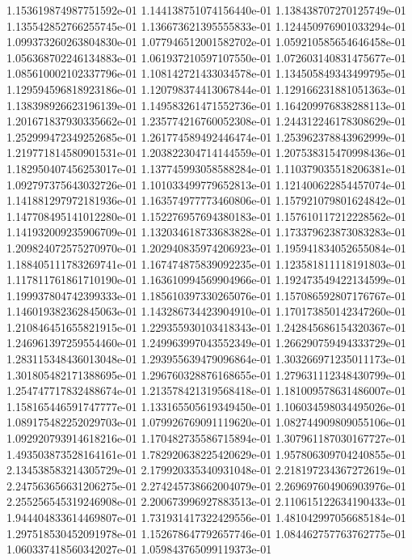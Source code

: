 1.153619874987751592e-01
1.144138751074156440e-01
1.138438707270125749e-01
1.135542852766255745e-01
1.136673621395555833e-01
1.124450976901033294e-01
1.099373260263804830e-01
1.077946512001582702e-01
1.059210585654646458e-01
1.056368702246134883e-01
1.061937210597107550e-01
1.072603140831475677e-01
1.085610002102337796e-01
1.108142721433034578e-01
1.134505849343499795e-01
1.129594596818923186e-01
1.120798374413067844e-01
1.129166231881051363e-01
1.138398926623196139e-01
1.149583261471552736e-01
1.164209976838288113e-01
1.201671837930335662e-01
1.235774216760052308e-01
1.244312246178308629e-01
1.252999472349252685e-01
1.261774589492446474e-01
1.253962378843962999e-01
1.219771814580901531e-01
1.203822304714144559e-01
1.207538315470998436e-01
1.182950407456253017e-01
1.137745993058588284e-01
1.110379035518206381e-01
1.092797375643032726e-01
1.101033499779652813e-01
1.121400622854457074e-01
1.141881297972181936e-01
1.163574977773460806e-01
1.157921079801624842e-01
1.147708495141012280e-01
1.152276957694380183e-01
1.157610117212228562e-01
1.141932009235906709e-01
1.132034618733683828e-01
1.173379623873083283e-01
1.209824072575270970e-01
1.202940835974206923e-01
1.195941834052655084e-01
1.188405111783269741e-01
1.167474875839092235e-01
1.123581811118191803e-01
1.117811761861710190e-01
1.163610994569904966e-01
1.192473549422134599e-01
1.199937804742399333e-01
1.185610397330265076e-01
1.157086592807176767e-01
1.146019382362845063e-01
1.143286734423904910e-01
1.170173850142347260e-01
1.210846451655821915e-01
1.229355930103418343e-01
1.242845686154320367e-01
1.246961397259554460e-01
1.249963997043552349e-01
1.266290759494333729e-01
1.283115348436013048e-01
1.293955639479096864e-01
1.303266971235011173e-01
1.301805482171388695e-01
1.296760328876168655e-01
1.279631112348430799e-01
1.254747717832488674e-01
1.213578421319568418e-01
1.181009578631486007e-01
1.158165446591747777e-01
1.133165505619349450e-01
1.106034598034495026e-01
1.089175482252029703e-01
1.079926769091119620e-01
1.082744909809055106e-01
1.092920793914618216e-01
1.170482735586715894e-01
1.307961187030167727e-01
1.493503873528164161e-01
1.782920638225420629e-01
1.957806309704240855e-01
2.134538583214305729e-01
2.179920335340931048e-01
2.218197234367272619e-01
2.247563656631206275e-01
2.274245738662004079e-01
2.269697604906903976e-01
2.255256545319246908e-01
2.200673996927883513e-01
2.110615122634190433e-01
1.944404833614469807e-01
1.731931417322429556e-01
1.481042997056685184e-01
1.297518530452091978e-01
1.152678647792657746e-01
1.084462757763762775e-01
1.060337418560342027e-01
1.059843765099119373e-01
